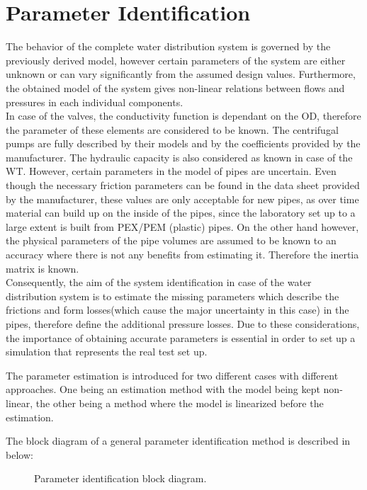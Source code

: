 \section{Parameter Identification}
\label{SubSecEstimation}

The behavior of the complete water distribution system is governed by the previously derived model, however certain parameters of the system are either unknown or can vary significantly from the assumed design values. Furthermore, the obtained model of the system gives non-linear relations between flows and pressures in each individual components. 
\\
In case of the valves, the conductivity function is dependant on the OD, therefore the parameter of these elements are considered to be known. The centrifugal pumps are fully described by their models and by the coefficients provided by the manufacturer. The hydraulic capacity is also considered as known in case of the WT. However, certain parameters in the model of pipes are uncertain. Even though the necessary friction parameters can be found in the data sheet provided by the manufacturer, these values are only acceptable for new pipes, as over time material can build up on the inside of the pipes, since the laboratory set up to a large extent is built from PEX/PEM (plastic) pipes. On the other hand however, the physical parameters of the pipe volumes are assumed to be known to an accuracy where there is not any benefits from estimating it. Therefore the inertia matrix is known.  
\\
Consequently, the aim of the system identification in case of the water distribution system is to estimate the missing parameters which describe the frictions and form losses(which cause the major uncertainty in this case) in the pipes, therefore define the additional pressure losses. Due to these considerations, the importance of obtaining accurate parameters is essential in order to set up a simulation that represents the real test set up. 

The parameter estimation is introduced for two different cases with different approaches. One being an estimation method with the model being kept non-linear, the other being a method where the model is  linearized before the estimation. 

The block diagram of a general parameter identification method is described in  below: 

\begin{figure}[H]
\centering
 
\caption{Parameter identification block diagram. }
\label{fig:parame_block}
\end{figure}


